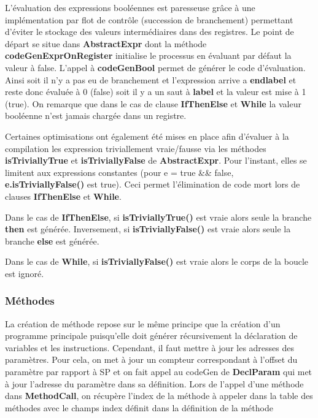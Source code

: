 \documentclass[12pt, a4paper, one side]{article}
\begin{document}
    L'évaluation des expressions booléennes est paresseuse grâce à une implémentation
    par flot de contrôle (succession de branchement) permettant d'éviter le stockage des
    valeurs intermédiaires dans des registres. Le point de départ se situe dans \textbf{AbstractExpr}
    dont la méthode \textbf{codeGenExprOnRegister} initialise le processus en évaluant par défaut la valeur à false. L'appel à \textbf{codeGenBool}
    permet de générer le code d'évaluation. Ainsi soit il n'y a pas eu de branchement et l'expression
    arrive a \textbf{endlabel} et reste donc évaluée à 0 (false) soit il y a un saut à \textbf{label} et la valeur
    est mise à 1 (true). On remarque que dans le cas de clause \textbf{IfThenElse} et \textbf{While} la valeur booléenne n'est jamais chargée dans un registre.

    Certaines optimisations ont également été mises en place afin d'évaluer à la compilation les expression
    triviallement vraie/fausse via les méthodes \textbf{isTriviallyTrue} et \textbf{isTriviallyFalse} de \textbf{AbstractExpr}.
    Pour l'instant, elles se limitent aux expressions constantes (pour e = true && false, \textbf{e.isTriviallyFalse()} est true).
    Ceci permet l'élimination de code mort lors de clauses \textbf{IfThenElse} et \textbf{While}.

    Dans le cas de \textbf{IfThenElse}, si \textbf{isTriviallyTrue()} est vraie alors seule la branche \textbf{then} est générée.
    Inversement, si \textbf{isTriviallyFalse()} est vraie alors seule la branche \textbf{else} est générée.

    Dans le cas de \textbf{While}, si \textbf{isTriviallyFalse()} est vraie alors le corps de la boucle est ignoré.


    \subsubsection{Méthodes}

    La création de méthode repose sur le même principe que la création d'un
    programme principale puisqu'elle doit générer récursivement la déclaration
    de variables et les instructions. Cependant, il faut mettre à jour les
    adresses des paramètres. Pour cela, on met à jour un compteur correspondant
    à l'offset du paramètre par rapport à SP et on fait appel au codeGen de
    \textbf{DeclParam} qui met à jour l'adresse du paramètre dans sa
    définition.
    Lors de l'appel d'une méthode dans \textbf{MethodCall}, on récupère l'index
    de la méthode à appeler dans la table des méthodes avec le champs index
    définit dans la définition de la méthode
\end{document}
